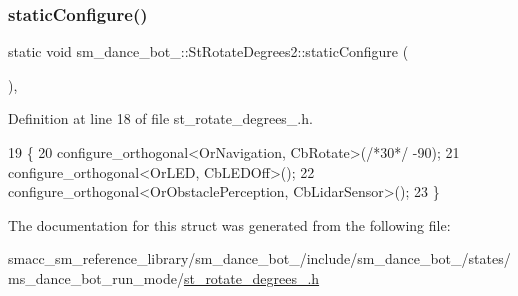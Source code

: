 \subsubsection{\texorpdfstring{static\+Configure()}{staticConfigure()}}
{\footnotesize\ttfamily static void sm\+\_\+dance\+\_\+bot\+\_\+::\+St\+Rotate\+Degrees2\+::static\+Configure (\begin{DoxyParamCaption}{ }\end{DoxyParamCaption})\hspace{0.3cm}{\ttfamily [inline]}, {\ttfamily [static]}}



Definition at line 18 of file st\+\_\+rotate\+\_\+degrees\+\_.\+h.


\begin{DoxyCode}
19   \{
20     configure\_orthogonal<OrNavigation, CbRotate>(\textcolor{comment}{/*30*/} -90);
21     configure\_orthogonal<OrLED, CbLEDOff>();
22     configure\_orthogonal<OrObstaclePerception, CbLidarSensor>();
23   \}
\end{DoxyCode}


The documentation for this struct was generated from the following file\+:\begin{DoxyCompactItemize}
\item 
smacc\+\_\+sm\+\_\+reference\+\_\+library/sm\+\_\+dance\+\_\+bot\+\_/include/sm\+\_\+dance\+\_\+bot\+\_/states/ms\+\_\+dance\+\_\+bot\+\_\+run\+\_\+mode/\hyperlink{sm__dance__bot__2_2include_2sm__dance__bot__2_2states_2ms__dance__bot__run__mode_2st__rotate__degrees__2_8h}{st\+\_\+rotate\+\_\+degrees\+\_.\+h}\end{DoxyCompactItemize}

